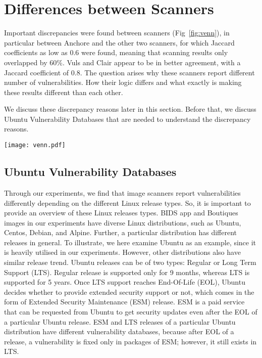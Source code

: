 \section{Differences between Scanners}

Important
discrepancies were found between scanners (Fig~\ref{fig:venn}), in
particular between Anchore and the other two scanners, for which Jaccard
coefficients as low as 0.6 were found, meaning that scanning results only
overlapped by 60\%. Vuls and Clair appear to be in better agreement, with a
Jaccard coefficient of 0.8.
The question arises why these scanners report different number of vulnerabilities.
How their logic differs and what exactly is making these results different than each other.

We discuss these discrepancy reasons later in this section. Before that, we discuss
Ubuntu Vulnerability Databases that are needed to understand the discrepancy reasons.
\begin{center}
\texttt{[image: venn.pdf]}
\label{fig:venn}
\end{center}

\subsection{Ubuntu Vulnerability Databases}

Through our experiments, we find that image scanners report vulnerabilities
differently depending on the different Linux release types. So, it is
important to provide an overview of these Linux releases types.
BIDS app and Boutiques images in our experiments have diverse Linux
distributions, such as Ubuntu, Centos, Debian, and Alpine. Further, a particular
distribution has different releases in general. To illustrate, we here examine Ubuntu as an example,
since it is heavily utilised in our experiments. However, other distributions also have
similar release trend. Ubuntu releases
can be of two types: Regular or Long Term Support (LTS).
Regular release is supported only for 9 months, whereas LTS is supported for 5 years. Once LTS support
reaches End-Of-Life (EOL), Ubuntu decides whether to provide extended security support or not, which comes
in the form of Extended Security Maintenance (ESM) release.
ESM is a paid service that can be requested from Ubuntu to get security
updates even after the EOL of a particular Ubuntu release. ESM and LTS releases of a particular Ubuntu distribution have different vulnerability
databases, because after EOL of a release, a vulnerability is fixed only in packages of ESM; however, it still
exists in LTS.

